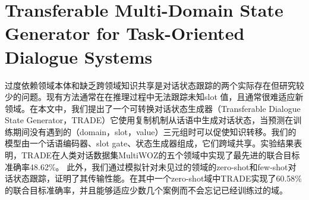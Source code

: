\documentclass[a4paper,UTF8]{article}
\numberwithin{equation}{section}
\begin{document}
\newpage
\section{Transferable Multi-Domain State Generator for Task-Oriented Dialogue Systems}
过度依赖领域本体和缺乏跨领域知识共享是对话状态跟踪的两个实际存在但研究较少的问题。现有方法通常在在推理过程中无法跟踪未知slot 值，且通常很难适应新领域。在本文中，我们提出了一个可转换对话状态生成器（Transferable Dialogue State Generator，TRADE）它使用复制机制从话语中生成对话状态，当预测在训练期间没有遇到的（domain，slot，value）三元组时可以促使知识转移。我们的模型由一个话语编码器、slot gate、状态生成器组成，它们跨域共享。实验结果表明，TRADE在人类对话数据集MultiWOZ的五个领域中实现了最先进的联合目标准确率48.62\%。
此外，我们通过模拟针对未见过的领域的zero-shot和few-shot对话状态跟踪，证明了其传输性能。在其中一个zero-shot域中TRADE实现了60.58\%的联合目标准确率，并且能够适应少数几个案例而不会忘记已经训练过的域。
\end{document}
